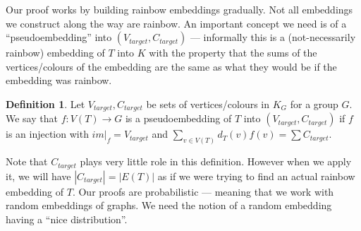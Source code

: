 \documentclass[a4paper,11pt,hidelinks]{amsart}
\theoremstyle{definition}
\newtheorem{definition}[theorem]{Definition}
\newcommand{\AM}[1]{\textcolor{blue}{[#1]}}
\begin{document}
Our proof works by building rainbow embeddings gradually. Not all embeddings we construct along the way are rainbow. An important concept we need is of a ``pseudoembedding'' into $(V_{target}, C_{target})$ --- informally this is a (not-necessarily rainbow) embedding of $T$ into $K$ with the property that the sums of the vertices/colours of the embedding are the same as what they would be if the embedding was rainbow.
\begin{definition}\label{Definition_pseudoembedding}
Let $V_{target},C_{target}$ be sets of vertices/colours in $K_G$ for a group $G$.
We say that $f:V(T)\to G$ is a pseudoembedding of $T$ into  $(V_{target},C_{target})$ if $f$ is an injection with  $im|_f=V_{target}$ and $\sum_{v\in V(T)} d_T(v)f(v)=\sum C_{target}$. %
\end{definition}
Note that $C_{target}$ plays very little role in this definition. However when we apply it, we will have $|C_{target}|=|E(T)|$ as if we were trying to find an actual rainbow embedding of $T$. 
Our proofs are probabilistic --- meaning that we work with random embeddings of graphs. We need the notion of a random embedding having a ``nice distribution''.
\end{document}
